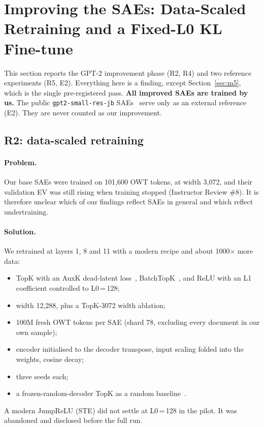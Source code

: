 \section{Improving the SAEs: Data-Scaled Retraining and a Fixed-L0 KL Fine-tune}\label{sec:improve}

This section reports the GPT-2 improvement phase (R2, R4) and two reference experiments (R5, E2). Everything here is a
 finding, except Section~\ref{sec:m5}, which is the single pre-registered  pass.
\textbf{All improved SAEs are trained by us.} The public \texttt{gpt2-small-res-jb} SAEs~\citep{bloom2024gpt2} serve only as an external reference
(E2). They are never counted as our improvement.

\subsection{R2: data-scaled retraining}\label{sec:r2}

\paragraph{Problem.} Our base SAEs were trained on 101,600 OWT tokens, at width 3,072, and their validation EV was
still rising when training stopped (Instructor Review \#8). It is therefore unclear which of our findings reflect SAEs
in general and which reflect undertraining.

\paragraph{Solution.} We retrained at layers 1, 8 and 11 with a modern recipe and about 1000$\times$ more data:
\begin{itemize}
\item TopK with an AuxK dead-latent loss~\citep{gao2024scaling}, BatchTopK~\citep{bussmann2024batchtopk}, and ReLU with an L1 coefficient
  controlled to L0\,=\,128;
\item width 12,288, plus a TopK-3072 width ablation;
\item 100M fresh OWT tokens per SAE (shard 78, excluding every document in our own sample);
\item encoder initialised to the decoder transpose, input scaling folded into the weights, cosine decay;
\item three seeds each;
\item a frozen-random-decoder TopK as a random baseline~\citep{korznikov2026random}.
\end{itemize}
A modern JumpReLU (STE) did not settle at L0\,=\,128 in the pilot. It was abandoned and disclosed before the full run.

